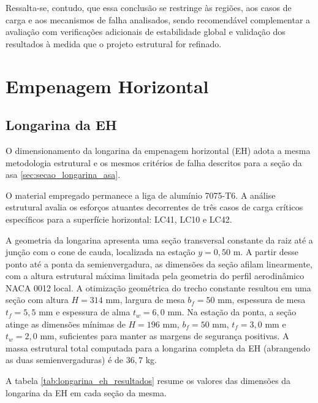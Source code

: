 Ressalta-se, contudo, que essa conclusão se restringe às regiões, aos casos de carga e aos mecanismos de falha analisados, sendo recomendável complementar a avaliação com verificações adicionais de estabilidade global e validação dos resultados à medida que o projeto estrutural for refinado.

\section{Empenagem Horizontal}
\subsection{Longarina da EH}

O dimensionamento da longarina da empenagem horizontal (EH) adota a mesma metodologia estrutural e os mesmos critérios de falha descritos para a seção da asa \ref{sec:secao_longarina_asa}. 

O material empregado permanece a liga de alumínio 7075-T6. A análise estrutural avalia os esforços atuantes decorrentes de três casos de carga críticos específicos para a superfície horizontal: LC41, LC10 e LC42.

A geometria da longarina apresenta uma seção transversal constante da raiz até a junção com o cone de cauda, localizada na estação $y = 0,50$ m. A partir desse ponto até a ponta da semienvergadura, as dimensões da seção afilam linearmente, com a altura estrutural máxima limitada pela geometria do perfil aerodinâmico NACA 0012 local.   A otimização geométrica do trecho constante resultou em uma seção com altura $H = 314$ mm, largura de mesa $b_f = 50$ mm, espessura de mesa $t_f = 5,5$ mm e espessura de alma $t_w = 6,0$ mm. Na estação da ponta, a seção atinge as dimensões mínimas de $H = 196$ mm, $b_f = 50$ mm, $t_f = 3,0$ mm e $t_w = 2,0$ mm, suficientes para manter as margens de segurança positivas. A massa estrutural total computada para a longarina completa da EH (abrangendo as duas semienvergaduras) é de $36,7$ kg.

A tabela \ref{tab:longarina_eh_resultados} resume os valores das dimensões da longarina da EH em cada seção da mesma.

